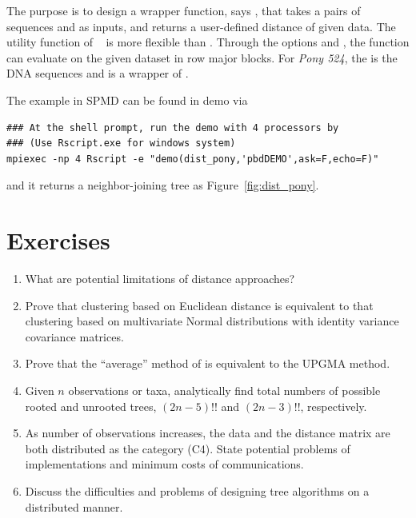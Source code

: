 The purpose is to design a wrapper function, says ,
that takes a pairs of sequences  and  as inputs, and
returns a user-defined distance of given data.
The utility function 
of ~\citep{Chen2012pbdMPIpackage}
is more flexible than .
Through the options  and , the
function can evaluate  on the given dataset  in
row major blocks.
For {\it Pony 524}, the  is the DNA sequences and 
is a wrapper of .

The example in SPMD can be found in demo via
\begin{lstlisting}
### At the shell prompt, run the demo with 4 processors by
### (Use Rscript.exe for windows system)
mpiexec -np 4 Rscript -e "demo(dist_pony,'pbdDEMO',ask=F,echo=F)"
\end{lstlisting}
and it returns a neighbor-joining tree as Figure~\ref{fig:dist_pony}.



\section{Exercises}
\label{sec:pairwise_exercise}

\begin{enumerate}[label=\thechapter-\arabic*]

\item
What are potential limitations of distance approaches?

\item
Prove that clustering based on Euclidean distance is equivalent to that
clustering based on multivariate Normal distributions with identity variance
covariance matrices.

\item
Prove that the ``average'' method of  is equivalent to the
UPGMA method.

\item
Given $n$ observations or taxa, analytically find total numbers of possible
rooted and unrooted trees, $(2n-5)!!$ and $(2n-3)!!$, respectively.

\item
As number of observations increases, the data and the distance matrix are
both distributed as the category (C4). State potential problems of
implementations and minimum costs of communications.

\item
Discuss the difficulties and problems of designing tree algorithms on a
distributed manner.

\end{enumerate}

